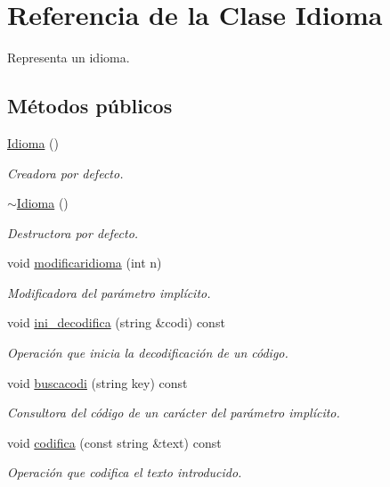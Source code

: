 \hypertarget{class_idioma}{}\section{Referencia de la Clase Idioma}
\label{class_idioma}


Representa un idioma.  


\subsection*{Métodos públicos}
\begin{DoxyCompactItemize}
\item 
\hyperlink{class_idioma_a6722a621ce03825772493e67e5a17215}{Idioma} ()
\begin{DoxyCompactList}\small\item\em Creadora por defecto. \end{DoxyCompactList}\item 
\hyperlink{class_idioma_a80c90f8c9a7f824d7d7d171b9face201}{$\sim$\+Idioma} ()
\begin{DoxyCompactList}\small\item\em Destructora por defecto. \end{DoxyCompactList}\item 
void \hyperlink{class_idioma_ad29b4c109c3fd61d7753c3345c438694}{modificaridioma} (int n)
\begin{DoxyCompactList}\small\item\em Modificadora del parámetro implícito. \end{DoxyCompactList}\item 
void \hyperlink{class_idioma_a797cfc4dd3d423c41f46926a68410992}{ini\+\_\+decodifica} (string \&codi) const
\begin{DoxyCompactList}\small\item\em Operación que inicia la decodificación de un código. \end{DoxyCompactList}\item 
void \hyperlink{class_idioma_a23589aa5ba65f484e2477ed611ce151f}{buscacodi} (string key) const
\begin{DoxyCompactList}\small\item\em Consultora del código de un carácter del parámetro implícito. \end{DoxyCompactList}\item 
void \hyperlink{class_idioma_a035524146301a918ba0c019b25c10263}{codifica} (const string \&text) const
\begin{DoxyCompactList}\small\item\em Operación que codifica el texto introducido. \end{DoxyCompactList}\item 

\end{DoxyCompactItemize}
